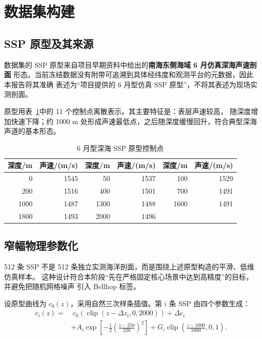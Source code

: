 \documentclass[UTF8,11pt]{ctexart}
\begin{document}
\section{数据集构建}

\subsection{SSP 原型及其来源}

数据集的 SSP 原型来自项目早期资料中给出的\textbf{南海东侧海域 6 月仿真深海声速剖面}
形态。当前冻结数据没有附带可追溯到具体经纬度和观测平台的元数据，因此本报告将其准确
表述为“项目提供的 6 月型仿真 SSP 原型”，不将其表述为现场实测剖面。

原型用表~\ref{tab:base-ssp}中的 11 个控制点离散表示。其主要特征是：表层声速较高，
随深度增加快速下降；约 1000 m 处形成声速最低点，之后随深度缓慢回升，符合典型深海
声道的基本形态。

\begin{table}[H]
\centering
\caption{6 月型深海 SSP 原型控制点}
\label{tab:base-ssp}
\begin{tabular}{rrrrrr}
\toprule
深度/m & 声速/(m/s) & 深度/m & 声速/(m/s) & 深度/m & 声速/(m/s) \\
\midrule
0 & 1545 & 50 & 1537 & 100 & 1529 \\
200 & 1516 & 400 & 1501 & 700 & 1491 \\
1000 & 1487 & 1300 & 1488 & 1600 & 1491 \\
1800 & 1493 & 2000 & 1496 & & \\
\bottomrule
\end{tabular}
\end{table}

\subsection{窄幅物理参数化}

512 条 SSP 不是 512 条独立实测海洋剖面，而是围绕上述原型构造的平滑、低维仿真样本。
这种设计符合本阶段“先在严格固定核心场景中达到高精度”的目标，并避免把随机网格噪声
引入 Bellhop 标签。

设原型曲线为 $c_0(z)$，采用自然三次样条插值。第 $i$ 条 SSP 由四个参数生成：
\begin{align}
  c_i(z)=&\;c_0\!\left(\operatorname{clip}(z-\Delta z_i,0,2000)\right)+\Delta c_i \\
         &+A_i\exp\left[-\frac{1}{2}\left(\frac{z-250}{220}\right)^2\right]
         +G_i\operatorname{clip}\left(\frac{z-1000}{1000},0,1\right).
  \label{eq:ssp}
\end{align}
\end{document}
